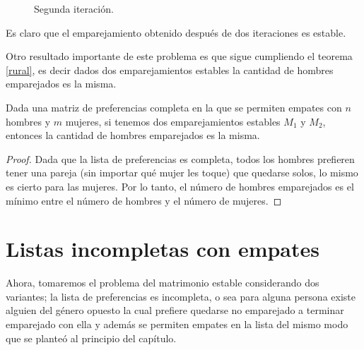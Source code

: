 \begin{eje}
\begin{figure}[H]

\caption{Segunda iteración.}
\end{figure}

Es claro que el emparejamiento obtenido después de dos iteraciones es estable.
\fin
\end{eje}

Otro resultado importante de este problema es que sigue cumpliendo el teorema \ref{rural}, es decir dados dos emparejamientos estables la cantidad de hombres emparejados es la misma.

\begin{cor}
Dada una matriz de preferencias completa en la que se permiten empates con $n$ hombres y $m$ mujeres, si tenemos dos emparejamientos estables $M_1$ y $M_2$, entonces la cantidad de hombres emparejados es la misma.
\end{cor}
\begin{proof}
Dada que la lista de preferencias es completa, todos los hombres prefieren tener una pareja (sin importar qué mujer les toque) que quedarse solos, lo mismo es cierto para las mujeres. Por lo tanto, el número de hombres emparejados es el mínimo entre el número de hombres y el número de mujeres. 
\end{proof}

\section{Listas incompletas con empates}
Ahora, tomaremos el problema del matrimonio estable considerando dos variantes; la lista de preferencias es incompleta, o sea para alguna persona existe alguien del género opuesto la cual prefiere quedarse no emparejado a terminar emparejado con ella y además se permiten empates en la lista del mismo modo que se planteó al principio del capítulo. 

